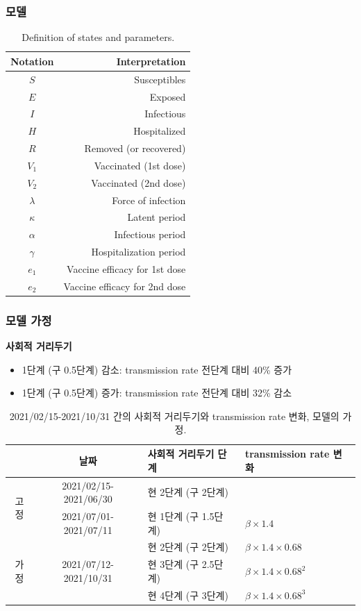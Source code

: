 \documentclass[aspectratio=169, 9pt, xcolor=dvipsnames]{beamer}
\begin{document}
	\begin{frame}\frametitle{모델}
	    \begin{table}
	    	\begin{tabular}{cr}
	    		\toprule
	    		\textbf{Notation} & \textbf{Interpretation} \\
	    		\midrule
	    		$S$ & Susceptibles \\
	    		$E$ & Exposed \\
	    		$I$ & Infectious \\
	    		$H$ & Hospitalized \\
	    		$R$ & Removed (or recovered) \\
	    		$V_1$ & Vaccinated (1st dose) \\
	    		$V_2$ & Vaccinated (2nd dose) \\
	    		$\lambda$ & Force of infection \\
	    		$\kappa$ & Latent period \\
	    		$\alpha$ & Infectious period \\
	    		$\gamma$ & Hospitalization period \\
	    		$e_1$ & Vaccine efficacy for 1st dose \\
	    		$e_2$ & Vaccine efficacy for 2nd dose \\
	    		\bottomrule
	    	\end{tabular}
	    	\caption{Definition of states and parameters.}
	    \end{table}
	\end{frame}

	\begin{frame}\frametitle{모델 가정}
		\textbf{사회적 거리두기}
		\begin{itemize}
			\item 1단계 (구 0.5단계) 감소: transmission rate 전단계 대비 40\% 증가
			\item 1단계 (구 0.5단계) 증가: transmission rate 전단계 대비 32\% 감소
		\end{itemize}
	    \begin{table}
	    	\begin{tabular}{ccll}
	    		\toprule
	    		 & \textbf{날짜} & \textbf{사회적 거리두기 단계} & \textbf{transmission rate 변화} \\
	    		\midrule
	    		\multirow{2}{*}{고정} & 2021/02/15-2021/06/30 & 현 2단계 (구 2단계) &  \\
	    		 & 2021/07/01-2021/07/11 & 현 1단계 (구 1.5단계) & $\beta \times 1.4$ \\
	    		\midrule
	    		\multirow{3}{*}{가정}& \multirow{3}{*}{2021/07/12-2021/10/31} & 현 2단계 (구 2단계) & $\beta \times 1.4 \times 0.68$ \\
	    		 &  & 현 3단계 (구 2.5단계) & $\beta \times 1.4 \times 0.68^2$ \\
	    		 &  & 현 4단계 (구 3단계) & $\beta \times 1.4 \times 0.68^3$ \\
	    		\bottomrule
	    	\end{tabular}
	    	\caption{2021/02/15-2021/10/31 간의 사회적 거리두기와 transmission rate 변화, 모델의 가정.}
	    \end{table}
	\end{frame}
\end{document}
